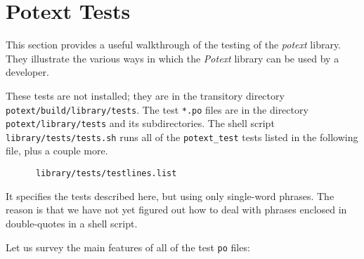 %
%
%

\section{Potext Tests}
\label{sec:potext_tests}

   This section provides a useful walkthrough of the testing
   of the \textsl{potext} library.
   They illustrate the various ways in which the \textsl{Potext} library
   can be used by a developer.

   These tests are not installed; they are in the transitory
   directory \texttt{potext/build/library/tests}.
   The test \texttt{*.po} files are in the 
   directory \texttt{potext/library/tests} and its subdirectories.
   The shell script
   \texttt{library/tests/tests.sh} runs all of the
   \texttt{potext\_test} tests listed in the following file,
   plus a couple more.

   \begin{verbatim}
      library/tests/testlines.list
   \end{verbatim}

   It specifies the tests
   described here, but using only single-word phrases.
   The reason is that we have not yet figured out how to deal
   with phrases enclosed in double-quotes in a shell script.

   Let us survey the main features of all of the test \texttt{po}
   files:

